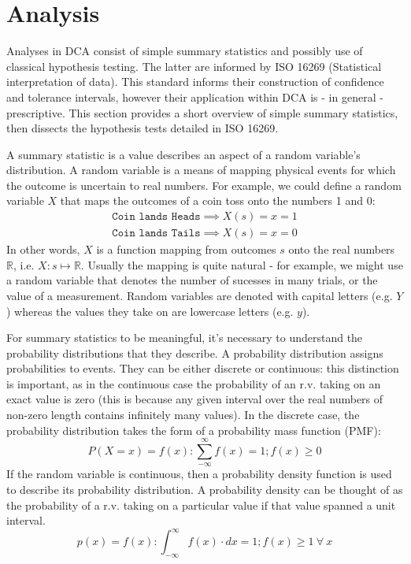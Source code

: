 \documentclass[11pt,a4paper,article]{memoir} %
\begin{document}
\section{Analysis}
Analyses in DCA consist of simple summary statistics and possibly use of classical hypothesis testing. The latter are informed by ISO 16269 (Statistical interpretation of data). This standard informs their construction of confidence and tolerance intervals, however their application within DCA is - in general - prescriptive. This section provides a short overview of simple summary statistics, then dissects the hypothesis tests detailed in ISO 16269.
\par
 A summary statistic is a value describes an aspect of a random variable's distribution. A random variable is a means of mapping physical events for which the outcome is uncertain to real numbers. For example, we could define a random variable $X$ that maps the outcomes of a coin toss onto the numbers 1 and 0:
 \begin{align}
	\texttt{Coin lands Heads} \implies X(s) = x = 1 \\
	\texttt{Coin lands Tails} \implies X(s) = x = 0
 \end{align}
In other words, $X$ is a function mapping from outcomes $s$ onto the real numbers $\mathbb{R}$, i.e. $X: s \mapsto \mathbb{R}$. Usually the mapping is quite natural - for example, we might use a random variable that denotes the number of sucesses in many trials, or the value of a measurement. Random variables are denoted with capital letters (e.g. $Y$) whereas the values they take on are lowercase letters (e.g. $y$).
\par
For summary statistics to be meaningful, it's necessary to understand the probability distributions that they describe. A probability distribution assigns probabilities to events. They can be either discrete or continuous: this distinction is important, as in the continuous case the probability of an r.v. taking on an exact value is zero (this is because any given interval over the real numbers of non-zero length contains infinitely many values). In the discrete case, the probability distribution takes the form of a probability mass function (PMF):
\[
	P(X = x) = f(x) : \sum_{-\infty}^{\infty} f(x) = 1; f(x) \geq 0
\]
If the random variable is continuous, then a probability density function is used to describe its probability distribution. A probability density can be thought of as the probability of a r.v. taking on a particular value if that value spanned a unit interval.
\[
	p(x) = f(x) : \int_{-\infty}^{\infty}f(x)\cdot dx = 1; f(x) \geq 1 \ \forall \ x
\]
\end{document}
